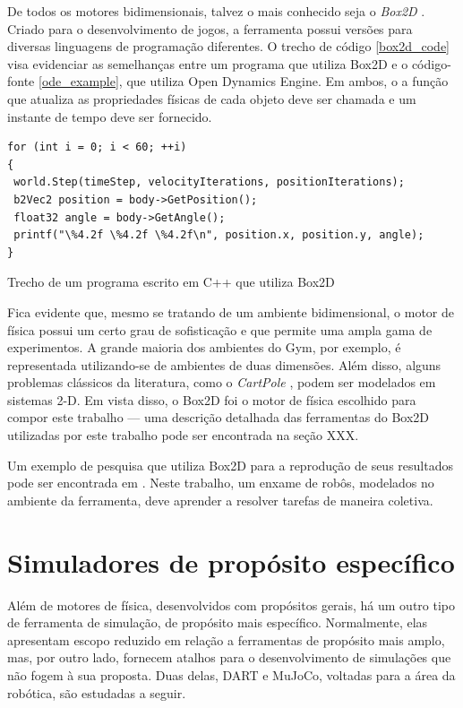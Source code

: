 \documentclass[cic,tc]{iiufrgs}
\newenvironment{longlisting}{\captionsetup{type=listing}}{}
\begin{document}
De todos os motores bidimensionais, talvez o mais conhecido seja o \textit{Box2D}
\cite{Box2d}. Criado para o desenvolvimento de jogos, a ferramenta possui
versões para diversas linguagens de programação diferentes. O trecho de código
\ref{box2d_code} visa evidenciar as semelhanças entre um programa que utiliza Box2D e o
código-fonte \ref{ode_example}, que utiliza Open Dynamics Engine. Em ambos, o
a função que atualiza as propriedades físicas de cada objeto deve ser chamada
e um instante de tempo deve ser fornecido.


\begin{longlisting}
\begin{verbatim}
for (int i = 0; i < 60; ++i)
{
 world.Step(timeStep, velocityIterations, positionIterations);
 b2Vec2 position = body->GetPosition();
 float32 angle = body->GetAngle();
 printf("\%4.2f \%4.2f \%4.2f\n", position.x, position.y, angle);
}
\end{verbatim}
\caption[Trecho de código Box2D]{Trecho de um programa escrito em C++ que utiliza Box2D}
\label{box2d_code}
\end{longlisting}


Fica evidente que, mesmo se tratando de um ambiente bidimensional, o motor de
física possui um certo grau de sofisticação e que permite uma ampla gama de
experimentos. A grande maioria dos ambientes do Gym, por exemplo, é representada
utilizando-se de ambientes de duas dimensões. Além disso, alguns problemas
clássicos da literatura, como o \textit{CartPole} \cite{ClassicRLProblems},
podem ser modelados em sistemas 2-D. Em vista disso, o Box2D foi o motor de
física escolhido para compor este trabalho --- uma descrição detalhada das
ferramentas do Box2D utilizadas por este trabalho pode ser encontrada na seção
XXX.



Um exemplo de pesquisa que utiliza Box2D para a reprodução de seus resultados
pode ser encontrada em \cite{Box2DExample}. Neste trabalho, um enxame de robôs,
modelados no ambiente da ferramenta, deve aprender a resolver tarefas de maneira
coletiva.

\section{Simuladores de propósito específico}

Além de motores de física, desenvolvidos com propósitos gerais, há um outro
tipo de ferramenta de simulação, de propósito mais específico. Normalmente, elas
apresentam escopo reduzido em relação a ferramentas de propósito mais amplo, mas,
por outro lado, fornecem atalhos para o desenvolvimento de simulações que não
fogem à sua proposta. Duas delas, DART e MuJoCo, voltadas para a área da robótica,
são estudadas a seguir.
\end{document}
